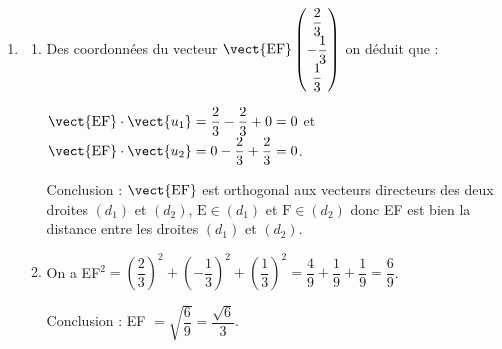 \begin{enumerate}
\begin{enumerate}
$-2\times 0 + 1 + t + 5(2 + t) + 5 = 0 \iff 1 + t + 10 + 5t + 5 = 0\iff 6t + 16 = 0 \iff t = - \dfrac83$, d'où en remplaçant dans $x,\,y,\,$ et $z$, on obtient   F\:$\left(0~;~- \dfrac53~;~-\dfrac23\right)$.

Soit $(\delta)$ la droite passant par F et de vecteur directeur $\vect{w}$. On admet que les droites $(\delta)$ et $(d_1)$ sont sécantes en un point E de coordonnées $\left( -\dfrac23~;~- \dfrac43~;~-1\right)$.
	\end{enumerate}
\item 
	\begin{enumerate}
		\item 
Des coordonnées du vecteur $\vect{\text{EF}}\begin{pmatrix}\dfrac23\\-\dfrac13\\\dfrac13\end{pmatrix}$ on  déduit que :

$\vect{\text{EF}} \cdot \vect{u_1} = \dfrac23 - \dfrac23 + 0 = 0$ et 
$\vect{\text{EF}} \cdot \vect{u_2} = 0  - \dfrac23 + \dfrac23 = 0$.

Conclusion : $\vect{\text{EF}}$ est orthogonal aux vecteurs directeurs des deux droites $(d_1)$ et $(d_2)$, $\text{E} \in (d_1)$ et $\text{F} \in (d_2)$ donc EF est bien la distance entre les droites $(d_1)$ et $(d_2)$.
		\item 
		On a EF$^2 = \left(\dfrac23\right)^2 +  \left(-\dfrac13\right)^2 +  \left(\dfrac13 \right)^2  = \dfrac49 + \dfrac19 + \dfrac19 = \dfrac69$.
		
		Conclusion : EF $ = \sqrt{\dfrac69} = \dfrac{\sqrt{6}}{3}$.
	\end{enumerate}
\end{enumerate}
